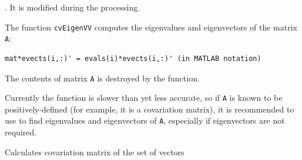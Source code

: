 \begin{description}
. It is modified during the processing.
\end{description}


The function \texttt{cvEigenVV} computes the eigenvalues and eigenvectors of the matrix \texttt{A}:

\begin{lstlisting}
mat*evects(i,:)' = evals(i)*evects(i,:)' (in MATLAB notation)
\end{lstlisting}

The contents of matrix \texttt{A} is destroyed by the function.

Currently the function is slower than  yet less accurate,
so if \texttt{A} is known to be positively-defined (for example, it
is a covariation matrix), it is recommended to use  to find
eigenvalues and eigenvectors of \texttt{A}, especially if eigenvectors
are not required.

\label{CalcCovarMatrix}

Calculates covariation matrix of the set of vectors


